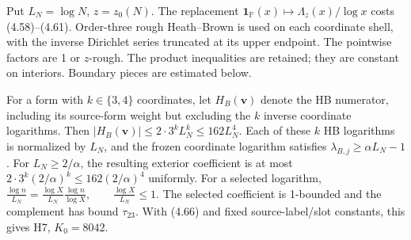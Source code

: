 Put $L_N=\log N$, $z=z_0(N)$.
The replacement $\mathbf1_{\mathbb P}(x)\mapsto\Lambda_z(x)/\log x$ costs (4.58)--(4.61).
Order-three rough Heath--Brown \cite{ref6} is used on each coordinate shell,
with the inverse Dirichlet series truncated at its upper endpoint.
The pointwise factors are 1 or $z$-rough.
The product inequalities are retained; they are constant on interiors.
Boundary pieces are estimated below.

For a form with $k\in\{3,4\}$ coordinates, let $H_B(\mathbf v)$
denote the HB numerator, including its source-form weight but excluding
the $k$ inverse coordinate logarithms. Then
$|H_B(\mathbf v)|\le2\cdot3^kL_N^k\le162L_N^4$.
Each of these $k$ HB logarithms is normalized by $L_N$, and the frozen coordinate logarithm satisfies $\lambda_{B,j}\ge\alpha L_N-1$.
For $L_N\ge2/\alpha$, the resulting exterior coefficient is at most
$2\cdot3^k(2/\alpha)^k\le162(2/\alpha)^4$ uniformly.
For a selected logarithm,
$\frac{\log n}{L_N}=\frac{\log X}{L_N}\frac{\log n}{\log X},
 \qquad \frac{\log X}{L_N}\le1.$
The selected coefficient is 1-bounded and the complement has bound $\tau_{23}$.
With (4.66) and fixed source-label/slot constants, this gives H7, $K_0=8042$.

